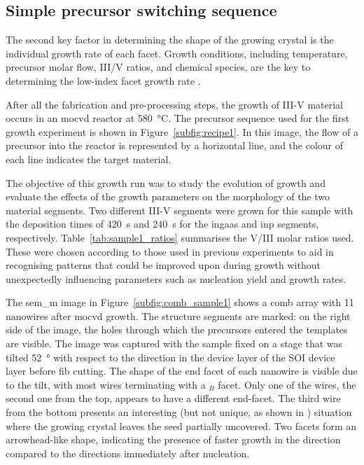 \subsection{Simple precursor switching sequence}

The second key factor in determining the shape of the growing crystal is the individual growth rate of each facet. Growth conditions, including temperature, precursor molar flow, III/V ratios, and chemical species, are the key to determining the low-index facet growth rate \cite{Borg2015, Elsner1992}.

After all the fabrication and pre-processing steps, the growth of III-V material occurs in an \acf{mocvd} reactor at \qty{580}{\degreeCelsius}. The precursor sequence used for the first growth experiment is shown in Figure~\ref{subfig:recipe1}. In this image, the flow of a precursor into the reactor is represented by a horizontal line, and the colour of each line indicates the target material.

The objective of this growth run was to study the evolution of growth and evaluate the effects of the growth parameters on the morphology of the two material segments. Two different III-V segments were grown for this sample with the deposition times of \qty{420}{\second} and \qty{240}{\second} for the \acs{ingaas} and \acs{inp} segments, respectively. Table~\ref{tab:sample1_ratios} summarises the V/III molar ratios used. These were chosen according to those used in previous experiments to aid in recognising patterns that could be improved upon during growth without unexpectedly influencing parameters such as nucleation yield and growth rates.

The \acs{sem_m} image in Figure~\ref{subfig:comb_sample1} shows a comb array with \num{11} nanowires after \acs{mocvd} growth. The structure segments are marked: on the right side of the image, the holes through which the precursors entered the templates are visible. The image was captured with the sample fixed on a stage that was tilted \qty{52}{\degree} with respect to the  direction in the device layer of the \acs{SOI} device layer before \acs{fib} cutting. The shape of the end facet of each nanowire is visible due to the tilt, with most wires terminating with a \(_B\) facet. Only one of the wires, the second one from the top, appears to have a different end-facet. The third wire from the bottom presents an interesting (but not unique, as shown in \cite{Scherrer2022}) situation where the growing crystal leaves the seed partially uncovered. Two  facets form an arrowhead-like shape, indicating the presence of faster growth in the  direction compared to the  directions immediately after nucleation.

